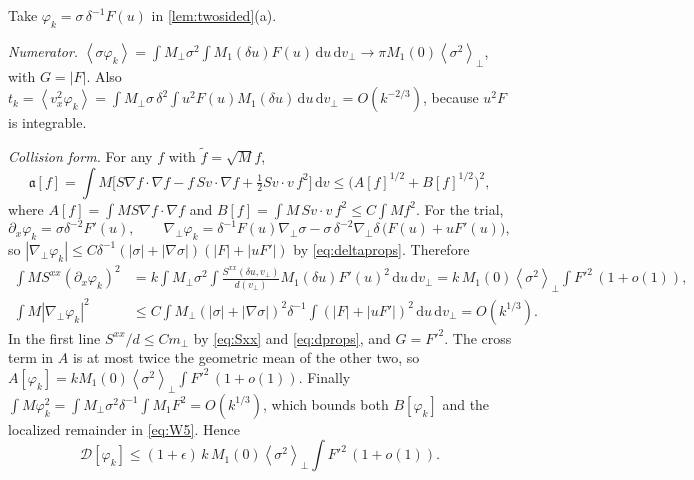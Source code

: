 \documentclass[11pt]{article}
\newcommand{\dd}{\,\mathrm d}
\newcommand{\av}[1]{\left\langle #1\right\rangle}
\newcommand{\D}{\mathcal D}
\theoremstyle{definition}
\theoremstyle{remark}
\numberwithin{equation}{section}
\begin{document}
Take $\varphi_k=\sigma\,\delta^{-1}F(u)$ in \cref{lem:twosided}(a).

\emph{Numerator.}
$\av{\sigma\varphi_k}=\int M_\perp\sigma^2\!\int M_1(\delta u)F(u)\dd u\dd v_\perp
\to\pi M_1(0)\av{\sigma^2}_\perp$, with $G=|F|$. Also
$t_k=\av{v_x^2\varphi_k}=\int M_\perp\sigma\,\delta^2\!\int u^2F(u)M_1(\delta u)
\dd u\dd v_\perp=O(k^{-2/3})$, because $u^2F$ is integrable.

\emph{Collision form.} For any $f$ with $\widetilde f=\sqrt Mf$,
\begin{equation}
 \mathfrak a[f]=\int M\bigl[S\nabla f\cdot\nabla f-f\,Sv\cdot\nabla f
    +\tfrac12Sv\cdot v\,f^2\bigr]\dd v
 \leq\bigl(A[f]^{1/2}+B[f]^{1/2}\bigr)^2,
 \label{eq:aAB}
\end{equation}
where $A[f]=\int MS\nabla f\cdot\nabla f$ and
$B[f]=\int M\,Sv\cdot v\,f^2\leq C\int Mf^2$. For the trial,
\[
 \partial_x\varphi_k=\sigma\delta^{-2}F'(u),\qquad
 \nabla_\perp\varphi_k=\delta^{-1}F(u)\nabla_\perp\sigma
   -\sigma\,\delta^{-2}\nabla_\perp\delta\,\bigl(F(u)+uF'(u)\bigr),
\]
so $|\nabla_\perp\varphi_k|\leq C\delta^{-1}(|\sigma|+|\nabla\sigma|)
(|F|+|uF'|)$ by \eqref{eq:deltaprops}. Therefore
\begin{align*}
 \int MS^{xx}(\partial_x\varphi_k)^2
 &=k\int M_\perp\sigma^2\!\int\frac{S^{xx}(\delta u,v_\perp)}{d(v_\perp)}
    M_1(\delta u)F'(u)^2\dd u\dd v_\perp
  =k\,M_1(0)\av{\sigma^2}_\perp\!\int F'^2\,(1+o(1)),\\
 \int M|\nabla_\perp\varphi_k|^2
 &\leq C\int M_\perp(|\sigma|+|\nabla\sigma|)^2\delta^{-1}\!
     \int(|F|+|uF'|)^2\dd u\dd v_\perp=O(k^{1/3}).
\end{align*}
In the first line $S^{xx}/d\leq Cm_\perp$ by \eqref{eq:Sxx} and
\eqref{eq:dprops}, and $G=F'^2$. The cross term in $A$ is at most twice
the geometric mean of the other two, so
$A[\varphi_k]=kM_1(0)\av{\sigma^2}_\perp\int F'^2\,(1+o(1))$. Finally
$\int M\varphi_k^2=\int M_\perp\sigma^2\delta^{-1}\!\int M_1F^2=O(k^{1/3})$,
which bounds both $B[\varphi_k]$ and the localized remainder in
\eqref{eq:W5}. Hence
\begin{equation}
 \D[\varphi_k]\leq(1+\epsilon)\,k\,M_1(0)\av{\sigma^2}_\perp\!\int F'^2\,(1+o(1)).
 \label{eq:lowerD}
\end{equation}
\end{document}
